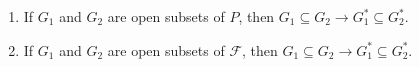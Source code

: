 \begin{enumerate}
\item If $G_1$ and $G_2$ are open subsets of $P$, then $G_1 \subseteq G_2 \rightarrow G_1^* \subseteq G_2^*$.
\item If $G_1$ and $G_2$ are open subsets of $\mathcal{F}$, then $G_1 \subseteq G_2 \rightarrow G_1^* \subseteq G_2^*$.
\end{enumerate}
